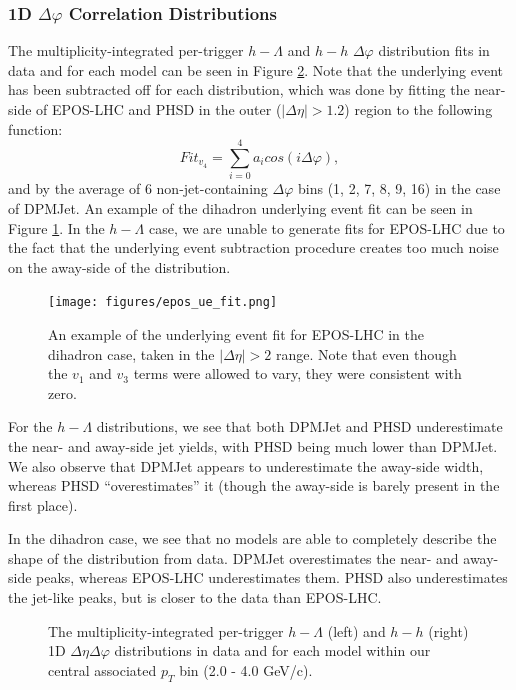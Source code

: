 \subsubsection{1D $\Delta\varphi$ Correlation Distributions}
\label{model_1d_correlations}

The multiplicity-integrated per-trigger $h-\Lambda$ and $h-h$ $\Delta\varphi$ distribution fits in data and for each model can be seen in Figure \ref{1d_modelcomp}. Note that the underlying event has been subtracted off for each distribution, which was done by fitting the near-side of EPOS-LHC and PHSD in the outer ($|\Delta\eta| > 1.2$) region to the following function:
\begin{equation}
Fit_{v_{4}} = \sum_{i=0}^{4} a_{i}cos(i\Delta\varphi),
\end{equation}
and by the average of 6 non-jet-containing $\Delta\varphi$ bins (1, 2, 7, 8, 9, 16) in the case of DPMJet. An example of the dihadron underlying event fit can be seen in Figure \ref{epos_ue_fit}. In the $h-\Lambda$ case, we are unable to generate fits for EPOS-LHC due to the fact that the underlying event subtraction procedure creates too much noise on the away-side of the distribution.

\begin{figure}[ht]
\centering
\texttt{[image: figures/epos\_ue\_fit.png]}
\caption{An example of the underlying event fit for EPOS-LHC in the dihadron case, taken in the $|\Delta\eta| > 2$ range. Note that even though the $v_1$ and $v_3$ terms were allowed to vary, they were consistent with zero.}
\label{epos_ue_fit}
\end{figure}

For the $h-\Lambda$ distributions, we see that both DPMJet and PHSD underestimate the near- and away-side jet yields, with PHSD being much lower than DPMJet. We also observe that DPMJet appears to underestimate the away-side width, whereas PHSD ``overestimates'' it (though the away-side is barely present in the first place).

In the dihadron case, we see that no models are able to completely describe the shape of the distribution from data. DPMJet overestimates the near- and away-side peaks, whereas EPOS-LHC underestimates them. PHSD also underestimates the jet-like peaks, but is closer to the data than EPOS-LHC.

\begin{figure}[ht]
\centering
\begin{subfigure}{
\texttt{[image: figures/h\_lambda\_1d\_modelcomp.png]}}
\end{subfigure}
\begin{subfigure}{
\texttt{[image: figures/h\_h\_1d\_modelcomp.png]}}
\end{subfigure}
\caption{The multiplicity-integrated per-trigger $h-\Lambda$ (left) and $h-h$ (right) 1D $\Delta\eta\Delta\varphi$ distributions in data and for each model within our central associated $p_{T}$ bin (2.0 - 4.0 GeV/c).}
\label{1d_modelcomp}
\end{figure}


